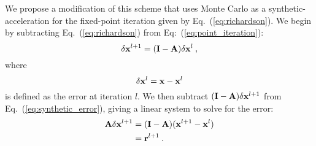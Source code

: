 We propose a modification of this scheme that uses Monte Carlo as a
synthetic-acceleration for the fixed-point iteration given by
Eq.~(\ref{eq:richardson}). We begin by subtracting Eq.~(\ref{eq:richardson})
from Eq:~(\ref{eq:point_iteration}):
\begin{equation}
  \delta \mathbf{x}^{l+1} = (\mathbf{I} - \mathbf{A})\delta \mathbf{x}^{l}\:,
  \label{eq:synthetic_error}
\end{equation}
where
\begin{equation}
  \delta \mathbf{x}^{l} = \mathbf{x} - \mathbf{x}^{l}
\end{equation}
is defined as the error at iteration $l$. We then subtract $(\mathbf{I}-\mathbf{A}) \delta
\mathbf{x}^{l+1}$ from Eq.~(\ref{eq:synthetic_error}), giving a linear system to
solve for the error:
\begin{equation}
  \begin{split}
    \mathbf{A} \delta \mathbf{x}^{l+1} &= (\mathbf{I} - \mathbf{A})(\mathbf{x}^{l+1} - \mathbf{x}^{l}) \\
    &= \mathbf{r}^{l+1}\:.
  \end{split}
  \label{eq:synthetic_error2}
\end{equation}

